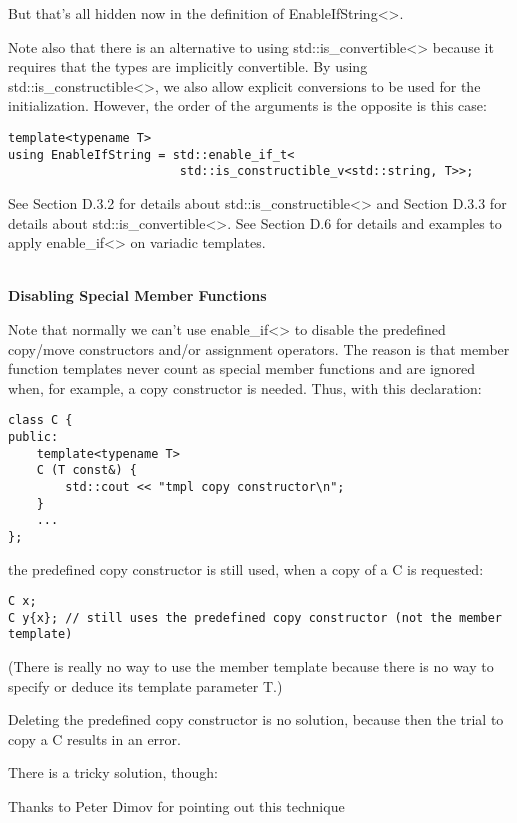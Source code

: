But that’s all hidden now in the definition of EnableIfString<>.

Note also that there is an alternative to using std::is\_convertible<> because it requires that the types are implicitly convertible. By using std::is\_constructible<>, we also allow explicit conversions to be used for the initialization. However, the order of the arguments is the opposite is this case:

\begin{lstlisting}[style=styleCXX]
template<typename T>
using EnableIfString = std::enable_if_t<
						std::is_constructible_v<std::string, T>>;
\end{lstlisting}

See Section D.3.2 for details about std::is\_constructible<> and Section D.3.3 for details about std::is\_convertible<>. See Section D.6 for details and examples to apply enable\_if<> on variadic templates.

\hspace*{\fill} \\ %
\noindent
\textbf{Disabling Special Member Functions}

Note that normally we can’t use enable\_if<> to disable the predefined copy/move constructors and/or assignment operators. The reason is that member function templates never count as special member functions and are ignored when, for example, a copy constructor is needed. Thus, with this declaration:

\begin{lstlisting}[style=styleCXX]
class C {
public:
	template<typename T>
	C (T const&) {
		std::cout << "tmpl copy constructor\n";
	}
	...
};
\end{lstlisting}

the predefined copy constructor is still used, when a copy of a C is requested:

\begin{lstlisting}[style=styleCXX]
C x;
C y{x}; // still uses the predefined copy constructor (not the member template)
\end{lstlisting}

(There is really no way to use the member template because there is no way to specify or deduce its template parameter T.)

Deleting the predefined copy constructor is no solution, because then the trial to copy a C results in an error.

There is a tricky solution, though:

\begin{tcolorbox}[colback=webgreen!5!white,colframe=webgreen!75!black]
\hspace*{0.75cm}Thanks to Peter Dimov for pointing out this technique
\end{tcolorbox}

